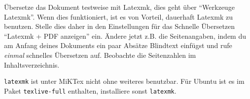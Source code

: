 \item Übersetze das Dokument testweise mit Latexmk, dies geht über \enquote{Werkzeuge \textrightarrow Latexmk}. Wenn dies funktioniert, ist es von Vorteil, dauerhaft Latexmk zu benutzen. Stelle dies daher in den Einstellungen für das Schnelle Übersetzen \enquote{Latexmk + PDF anzeigen} ein. Ändere jetzt z.B. die Seitenangaben, indem du am Anfang deines Dokuments ein paar Absätze Blindtext einfügst und rufe \emph{einmal} schnelles Übersetzen auf. Beobachte die Seitenzahlen im Inhaltsverzeichnis.
\begin{hinweis}
\texttt{latexmk} ist unter MiKTex nicht ohne weiteres benutzbar. Für Ubuntu ist es im Paket \texttt{texlive-full} enthalten, installiere sonst \texttt{latexmk}.
\end{hinweis}